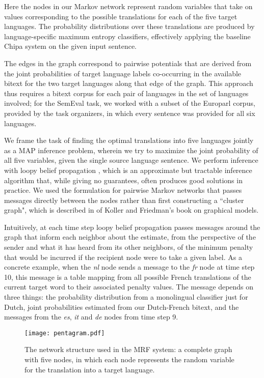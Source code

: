 Here the nodes in our Markov network represent random variables that take on
values corresponding to the possible translations for each of the five target
languages. The probability distributions over these translations are produced
by language-specific maximum entropy classifiers, effectively applying the
baseline Chipa system on the given input sentence.

The edges in the graph correspond to pairwise potentials that are derived from
the joint probabilities of target language labels co-occurring in the available
bitext for the two target languages along that edge of the graph. This approach
thus requires a bitext corpus for each pair of languages in the set of
languages involved; for the SemEval task, we worked with a subset of the
Europarl corpus, provided by the task organizers, in which every sentence was
provided for all six languages.

We frame the task of finding the optimal translations into five languages
jointly as a MAP inference problem, wherein we try to maximize the joint
probability of all five variables, given the single source language sentence.
We perform inference with loopy belief propagation
\cite{DBLP:conf/uai/MurphyWJ99}, which is an approximate but tractable
inference algorithm that, while giving no guarantees, often produces good
solutions in practice.
We used the formulation for pairwise Markov networks that passes messages
directly between the nodes rather than first constructing a ``cluster graph",
which is described in \cite[\S 11.3.5.1]{Koller+Friedman:09} of Koller and
Friedman's book on graphical models.

Intuitively, at each time step loopy belief propagation passes messages around
the graph that inform each neighbor about the estimate, from the perspective of
the sender and what it has heard from its other neighbors, of the minimum
penalty that would be incurred if the recipient node were to take a given
label. As a concrete example, when the \emph{nl} node sends a message to the
\emph{fr} node at time step 10, this message is a table mapping from all
possible French translations of the current target word to their associated
penalty values. The message depends on three things: the probability
distribution from a monolingual classifier just for Dutch, joint probabilities
estimated from our Dutch-French bitext, and the messages from the \emph{es},
\emph{it} and \emph{de} nodes from time step 9.

\begin{figure}
  \begin{center}
  \texttt{[image: pentagram.pdf]}
  \end{center}
  \caption{The network structure used in the MRF system: a complete graph with
  five nodes, in which each node represents the random variable for the
  translation into a target language.}
  \label{fig:pentagram}
\end{figure}

